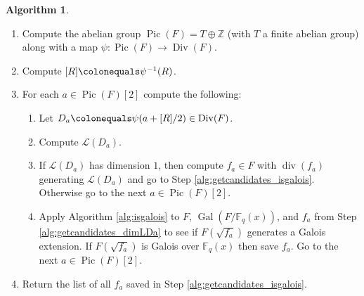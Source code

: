 \documentclass{dcthesis}
\newcommand{\ZZ}{\mathbb Z}
\newcommand{\FF}{\mathbb{F}}
\DeclareMathOperator{\Div}{Div}
\DeclareMathOperator{\Pic}{Pic}
\DeclareMathOperator{\ddiv}{div}
\DeclareMathOperator{\Gal}{Gal}
\numberwithin{equation}{section}
\theoremstyle{definition}
\newtheorem{alg}[equation]{Algorithm}
\theoremstyle{remark}
\begin{document}
{{\begin{alg}
\begin{enumerate}
\begin{equation}
          \end{equation}
          where
          $R_0,R_1,R_\infty$
          are defined to be the supports
          of
          $\ddiv(\phi)$,
          $\ddiv(\phi-1)$,
          and $\ddiv(1/\phi)$
          respectively.
        \item\label{alg:getcandidates_Pic}
          Compute the abelian group
          $\Pic(F)=T\oplus\ZZ$
          (with $T$ a finite abelian group)
          along with a map
          $\psi\colon\Pic(F)\to\Div(F)$.
        \item\label{alg:getcandidates_PicR}
          Compute
          $[R]\colonequals\psi^{-1}(R)$.
        \item\label{alg:getcandidates_Pic2}
          For each $a\in\Pic(F)[2]$ compute the
          following:
          \begin{enumerate}
            \item\label{alg:getcandidates_Da}
              Let $D_a\colonequals\psi(a+[R]/2)
              \in\Div(F)$.
            \item\label{alg:getcandidates_LDa}
              Compute $\mathscr{L}(D_a)$.
            \item\label{alg:getcandidates_dimLDa}
              If $\mathscr{L}(D_a)$ has dimension
              $1$, then compute
              $f_a\in F$ with $\ddiv(f_a)$
              generating $\mathscr{L}(D_a)$
              and go to Step
              \ref{alg:getcandidates_isgalois}.
              Otherwise go to the next
              $a\in\Pic(F)[2]$.
            \item\label{alg:getcandidates_isgalois}
              Apply Algorithm \ref{alg:isgalois}
              to $F$,
              $\Gal(F/\FF_q(x))$,
              and $f_a$
              from Step
              \ref{alg:getcandidates_dimLDa}
              to see if $F(\sqrt{f_a})$
              generates a Galois extension.
              If $F(\sqrt{f_a})$ is Galois over
              $\FF_q(x)$ then save $f_a$.
              Go to the next
              $a\in\Pic(F)[2]$.
          \end{enumerate}
        \item\label{alg:getcandidates_return}
          Return the list of all $f_a$
          saved in Step \ref{alg:getcandidates_isgalois}.
      \end{enumerate}

\end{alg}}}
\end{document}
